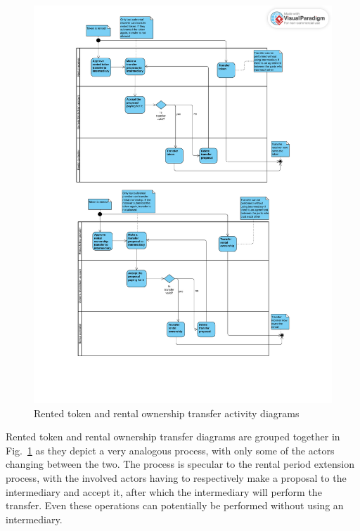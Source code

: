 \documentclass[english, LaM, oneside]{sapthesis}%
\begin{document}
\begin{figure}
    \centering
        \begin{adjustbox}{width=1\textwidth}
            \includegraphics{ActivityDiagrams/activity_rentalTransfer.pdf} 
        \end{adjustbox}
    \caption{Rented token and rental ownership transfer activity diagrams}
    \label{fig:RentalTransfer AD}
\end{figure}

Rented token and rental ownership transfer diagrams are grouped together in Fig.~\ref{fig:RentalTransfer AD} as they depict a very analogous process, with only some of the actors changing between the two. The process is specular to the rental period extension process, with the involved actors having to respectively make a proposal to the intermediary and accept it, after which the intermediary will perform the transfer.
Even these operations can potentially be performed without using an intermediary.
\end{document}
